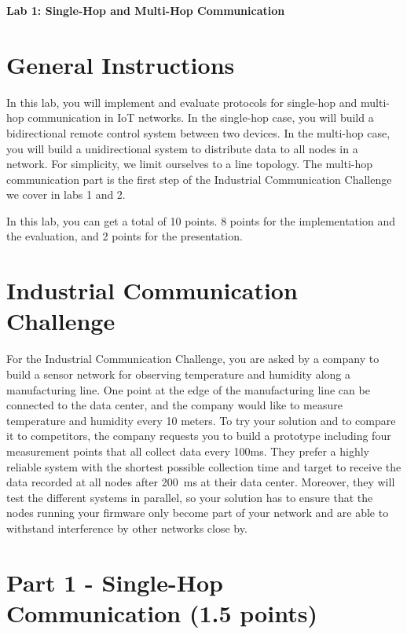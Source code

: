 \documentclass[11pt]{article}
\begin{document}
\begin{center}
{\Large \bf Lab 1: Single-Hop and Multi-Hop Communication }
\end{center}


\section*{General Instructions}

In this lab, you will implement and evaluate protocols for single-hop and multi-hop communication in IoT networks.
In the single-hop case, you will build a bidirectional remote control system between two devices.
In the multi-hop case, you will build a unidirectional system to distribute data to all nodes in a network. For simplicity, we limit ourselves to a line topology. 
The multi-hop communication part is the first step of the Industrial Communication Challenge we cover in labs 1 and 2.

In this lab, you can get a total of 10 points. 8 points for the implementation and the evaluation, and 2 points for the presentation.

\section*{Industrial Communication Challenge}

For the Industrial Communication Challenge, you are asked by a company to build a sensor network for observing temperature and humidity along a manufacturing line. One point at the edge of the manufacturing line can be connected to the data center, and the company would like to measure temperature and humidity every 10 meters. To try your solution and to compare it to competitors, the company requests you to build a prototype including four measurement points that all collect data every 100ms. They prefer a highly reliable system with the shortest possible collection time and target to receive the data recorded at all nodes after 200~ms at their data center. Moreover, they will test the different systems in parallel, so your solution has to ensure that the nodes running your firmware only become part of your network and are able to withstand interference by other networks close by.

\section*{Part 1 - Single-Hop Communication (1.5 points)}
\end{document}
